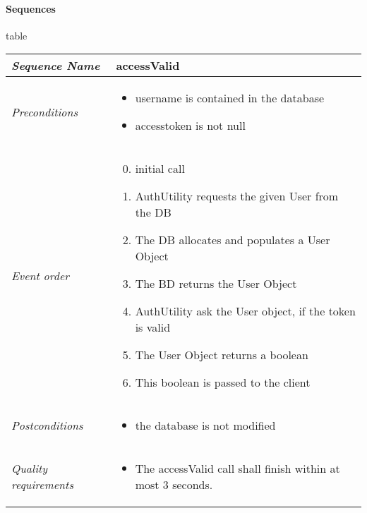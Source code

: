 	\paragraph{Sequences} table  \\
		\begin{tabular}{|p{}|p{}|}
			\hline
			\textit{Sequence Name}&\textbf{accessValid}\\
			\hline
			\textit{Preconditions}&
			\begin{itemize}
				\item username is contained in the database
				\item accesstoken is not null
			\end{itemize}\\
			\hline
			\textit{Event order}&
			\begin{enumerate}[1.]
				\setcounter{enumi}{-1}
				\item initial call
				\item AuthUtility requests the given User from the DB
				\item The DB allocates and populates a User Object
				\item The BD returns the User Object
				\item AuthUtility ask the User object, if the token is valid
				\item The User Object returns a boolean
				\item This boolean is passed to the client
			\end{enumerate}\\
			\hline
			\textit{Postconditions}&
			\begin{itemize}
				\item the database is not modified
			\end{itemize}\\
			\hline
			\textit{Quality requirements}&
			\begin{itemize}
				\item The accessValid call shall finish within at most 3 seconds.
			\end{itemize}\\
			\hline
		\end{tabular}

